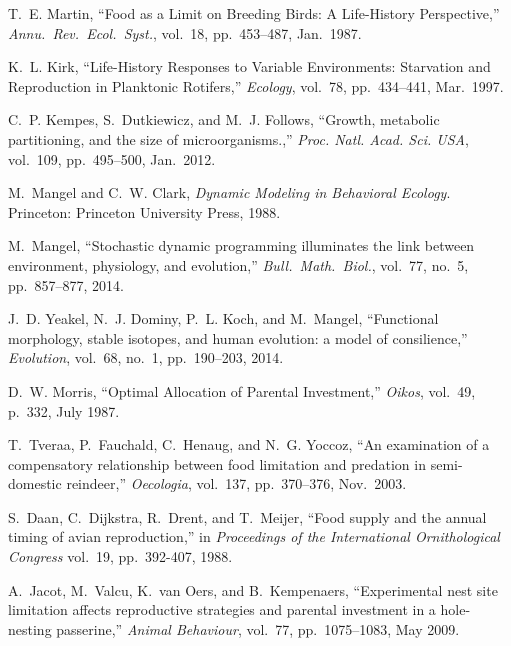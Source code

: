 \documentclass[twocolumn,preprintnumbers,amsmath,amssymb,superscriptaddress]{revtex4}
\begin{document}
%
\small{
\begin{thebibliography}{10}

 T.~E. Martin, ``{Food as a Limit on Breeding Birds: A
    Life-History Perspective},'' {\em Annu.\ Rev.\ Ecol.\ Syst.}, vol.~18,
  pp.~453--487, Jan.\ 1987.

 K.~L. Kirk, ``{Life-History Responses to Variable
    Environments: Starvation and Reproduction in Planktonic Rotifers},'' {\em
    Ecology}, vol.~78, pp.~434--441, Mar.\ 1997.

 C.~P. Kempes, S.~Dutkiewicz, and M.~J. Follows,
  ``{Growth, metabolic partitioning, and the size of microorganisms.},'' {\em
    Proc.  Natl. Acad. Sci. USA}, vol.~109, pp.~495--500, Jan.\ 2012.

 M.~Mangel and C.~W. Clark, {\em {Dynamic Modeling in
      Behavioral Ecology}}.  \newblock Princeton: Princeton University Press,
  1988.

 M.~Mangel, ``{Stochastic dynamic programming
    illuminates the link between environment, physiology, and evolution},''
  {\em Bull.\ Math.\ Biol.}, vol.~77, no.~5, pp.~857--877, 2014.

 J.~D. Yeakel, N.~J. Dominy, P.~L. Koch, and
  M.~Mangel, ``{Functional morphology, stable isotopes, and human evolution:
    a model of consilience},'' {\em Evolution}, vol.~68, no.~1, pp.~190--203,
  2014.

 D.~W. Morris, ``{Optimal Allocation of Parental
    Investment},'' {\em Oikos}, vol.~49, p.~332, July 1987.

 T.~Tveraa, P.~Fauchald, C.~Henaug, and N.~G. Yoccoz,
  ``{An examination of a compensatory relationship between food limitation
    and predation in semi-domestic reindeer},'' {\em Oecologia}, vol.~137,
  pp.~370--376, Nov.\ 2003.

 S.~Daan, C.~Dijkstra, R.~Drent, and T.~Meijer, ``{Food
    supply and the annual timing of avian reproduction},'' in {\em
    Proceedings of the International Ornithological Congress} vol.~19,
    pp.~392-407, 1988.

 A.~Jacot, M.~Valcu, K.~van Oers, and B.~Kempenaers,
  ``{Experimental nest site limitation affects reproductive strategies and
    parental investment in a hole-nesting passerine},'' {\em Animal
    Behaviour}, vol.~77, pp.~1075--1083, May 2009.


\end{thebibliography}}
\end{document}
